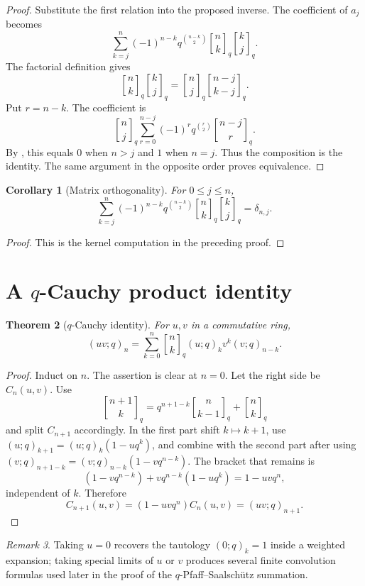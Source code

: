 \documentclass[11pt,oneside,openany]{book}
\newtheorem{theorem}{Theorem}[chapter]
\newtheorem{corollary}[theorem]{Corollary}
\theoremstyle{definition}
\theoremstyle{remark}
\newtheorem{remark}[theorem]{Remark}
\newcommand{\qbinom}[2]{\genfrac{[}{]}{0pt}{}{#1}{#2}_{q}}
\begin{document}
\begin{proof}
Substitute the first relation into the proposed inverse.  The coefficient of $a_j$ becomes
\[
 \sum_{k=j}^{n}(-1)^{n-k}q^{\binom{n-k}{2}}
 \qbinom nk\qbinom kj.
\]
The factorial definition gives
\[
 \qbinom nk\qbinom kj=\qbinom nj\qbinom{n-j}{k-j}.
\]
Put $r=n-k$.  The coefficient is
\[
 \qbinom nj
 \sum_{r=0}^{n-j}(-1)^rq^{\binom r2}\qbinom{n-j}{r}.
\]
By , this equals $0$ when $n>j$ and $1$ when $n=j$.  Thus the composition is the identity.  The same argument in the opposite order proves equivalence.
\end{proof}

\begin{corollary}[Matrix orthogonality]\label{cor:qbinomial-orthogonality}
For $0\le j\le n$,
\[
 \sum_{k=j}^{n}(-1)^{n-k}q^{\binom{n-k}{2}}
 \qbinom nk\qbinom kj=\delta_{n,j}.
\]
\end{corollary}

\begin{proof}
This is the kernel computation in the preceding proof.
\end{proof}

\section{A \texorpdfstring{$q$}{q}-Cauchy product identity}

\begin{theorem}[$q$-Cauchy identity]\label{thm:q-cauchy}
For $u,v$ in a commutative ring,
\[
 (uv;q)_n
 =\sum_{k=0}^{n}\qbinom nk (u;q)_k v^k(v;q)_{n-k}.
\]
\end{theorem}

\begin{proof}
Induct on $n$.  The assertion is clear at $n=0$.  Let the right side be $C_n(u,v)$.  Use
\[
 \qbinom{n+1}{k}=q^{n+1-k}\qbinom n{k-1}+\qbinom nk
\]
and split $C_{n+1}$ accordingly.  In the first part shift $k\mapsto k+1$, use
\((u;q)_{k+1}=(u;q)_k(1-uq^k)\), and combine with the second part after using
\((v;q)_{n+1-k}=(v;q)_{n-k}(1-vq^{n-k})\).
The bracket that remains is
\[
 (1-vq^{n-k})+vq^{n-k}(1-uq^k)=1-uvq^n,
\]
independent of $k$.  Therefore
\[
 C_{n+1}(u,v)=(1-uvq^n)C_n(u,v)=(uv;q)_{n+1}.
\]
\end{proof}

\begin{remark}
Taking $u=0$ recovers the tautology $(0;q)_k=1$ inside a weighted expansion; taking special limits of $u$ or $v$ produces several finite convolution formulas used later in the proof of the $q$-Pfaff--Saalsch\"utz summation.
\end{remark}
\end{document}
